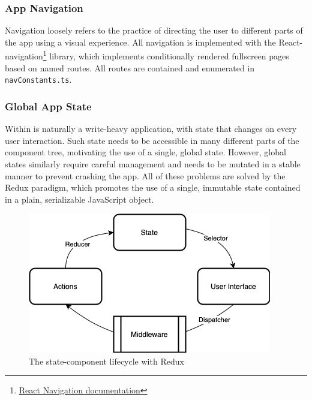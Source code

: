 \subsubsection{App Navigation}
Navigation loosely refers to the practice of directing the user to different parts of the app using a visual experience. All navigation is implemented with the React-navigation\footnote{\href{https://reactnavigation.org}{React Navigation documentation}} library, which implements conditionally rendered fullscreen pages based on named routes. All routes are contained and enumerated in \texttt{navConstants.ts}.

\subsubsection{Global App State}
Within is naturally a write-heavy application, with state that changes on every user interaction. Such state needs to be accessible in many different parts of the component tree, motivating the use of a single, global state. However, global states similarly require careful management and needs to be mutated in a stable manner to prevent crashing the app. All of these problems are solved by the Redux paradigm, which promotes the use of a single, immutable state contained in a plain, serializable JavaScript object.

\begin{figure}[h]
    \begin{center}
        \includegraphics[scale=0.55]{images/redux_state.png}
    \end{center}
    \caption{The state-component lifecycle with Redux}
    \label{fig:redux_state}
\end{figure}

